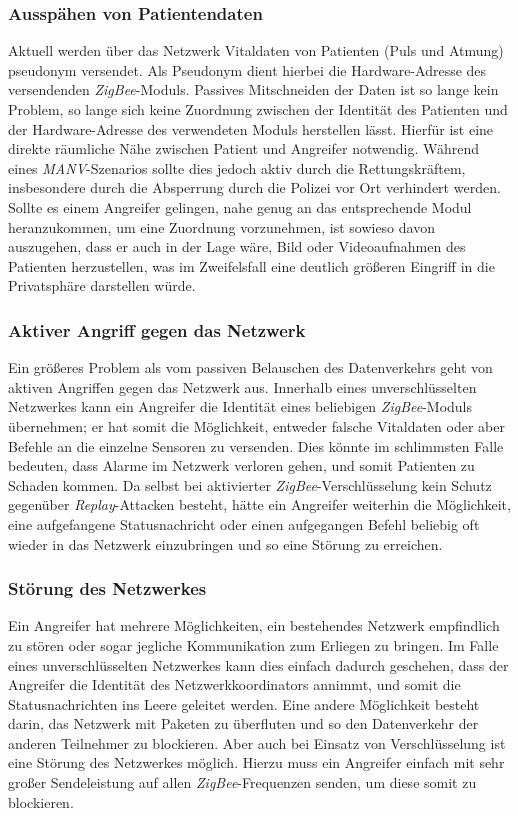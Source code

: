 \subsubsection{Ausspähen von Patientendaten}
Aktuell werden über das Netzwerk Vitaldaten von Patienten (Puls und Atmung) pseudonym versendet. Als Pseudonym dient 
hierbei die Hardware-Adresse des versendenden \emph{ZigBee}-Moduls. Passives Mitschneiden der Daten ist so lange kein Problem,
so lange sich keine Zuordnung zwischen der Identität des Patienten und der Hardware-Adresse des verwendeten Moduls
herstellen lässt. Hierfür ist eine direkte räumliche Nähe zwischen Patient und Angreifer notwendig. 
Während eines \emph{MANV}-Szenarios sollte dies jedoch aktiv durch die Rettungskräftem, insbesondere durch die Absperrung 
durch die Polizei vor Ort verhindert werden. Sollte es einem Angreifer gelingen, nahe genug an das entsprechende Modul
heranzukommen, um eine Zuordnung vorzunehmen, ist sowieso davon auszugehen, dass er auch in der Lage wäre, Bild oder
Videoaufnahmen des Patienten herzustellen, was im Zweifelsfall eine deutlich größeren Eingriff in die Privatsphäre 
darstellen würde.

\subsubsection{Aktiver Angriff gegen das Netzwerk}
Ein größeres Problem als vom passiven Belauschen des Datenverkehrs geht von aktiven Angriffen gegen das Netzwerk
aus. Innerhalb eines unverschlüsselten Netzwerkes kann ein Angreifer die Identität eines beliebigen \emph{ZigBee}-Moduls 
übernehmen; er hat somit die Möglichkeit, entweder falsche Vitaldaten oder aber Befehle an die einzelne Sensoren zu
versenden. Dies könnte im schlimmsten Falle bedeuten, dass Alarme im Netzwerk verloren gehen, und somit Patienten
zu Schaden kommen. Da selbst bei aktivierter \emph{ZigBee}-Verschlüsselung kein Schutz gegenüber 
\emph{Replay}-Attacken besteht, hätte
ein Angreifer weiterhin die Möglichkeit, eine aufgefangene Statusnachricht oder einen aufgegangen Befehl beliebig oft
wieder in das Netzwerk einzubringen und so eine Störung zu erreichen.

\subsubsection{Störung des Netzwerkes}
Ein Angreifer hat mehrere Möglichkeiten, ein bestehendes Netzwerk empfindlich zu stören oder sogar jegliche Kommunikation
zum Erliegen zu bringen. Im Falle eines unverschlüsselten Netzwerkes kann dies einfach dadurch geschehen, dass 
der Angreifer die Identität des Netzwerkkoordinators annimmt, und somit die Statusnachrichten ins Leere geleitet werden. Eine
andere Möglichkeit besteht darin, das Netzwerk mit Paketen zu überfluten und so den Datenverkehr der anderen Teilnehmer
zu blockieren. Aber auch bei Einsatz von Verschlüsselung ist eine Störung des Netzwerkes möglich. Hierzu muss ein Angreifer
einfach mit sehr großer Sendeleistung auf allen \emph{ZigBee}-Frequenzen senden, um diese somit zu blockieren. 

